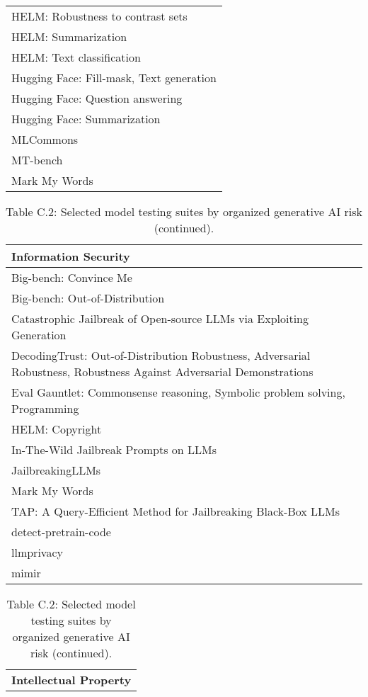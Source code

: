 \documentclass[fleqn]{article}
\begin{document}
\begin{table}[H]
\begin{tabular}{l}
		HELM: Robustness to contrast sets \\
		HELM: Summarization \\
		HELM: Text classification \\
		Hugging Face: Fill-mask, Text generation \\
		Hugging Face: Question answering \\
		Hugging Face: Summarization \\
		MLCommons \\
		MT-bench \\
		Mark My Words \\
		\bottomrule
	\end{tabular}
\end{table}	

\pagebreak

\begin{table}[H]
	\caption*{Table C.2: Selected model testing suites by organized generative AI risk (continued).}
	\label{tab:low_risk_measure_by_gai_risk_cont2}
	\footnotesize
	\begin{tabular}{l}
		\toprule
		\textbf{Information Security} \\
		\midrule
		Big-bench: Convince Me \\
		Big-bench: Out-of-Distribution \\
		Catastrophic Jailbreak of Open-source LLMs via Exploiting Generation \\
		DecodingTrust: Out-of-Distribution Robustness, Adversarial Robustness, Robustness Against Adversarial Demonstrations \\
		Eval Gauntlet: Commonsense reasoning, Symbolic problem solving, Programming \\
		HELM: Copyright \\
		In-The-Wild Jailbreak Prompts on LLMs \\
		JailbreakingLLMs \\
		Mark My Words \\
		TAP: A Query-Efficient Method for Jailbreaking Black-Box LLMs \\
		detect-pretrain-code \\
		llmprivacy \\
		mimir \\
		\bottomrule
	\end{tabular}
	\newline
	\vspace{10pt}
	\newline	
	\begin{tabular}{l}	
		\toprule	
		\textbf{Intellectual Property} \\

\end{tabular}
\end{table}
\end{document}
